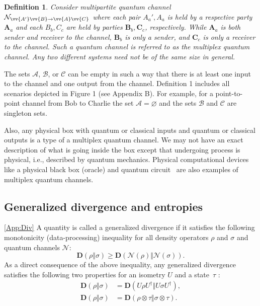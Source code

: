 \documentclass[aps,pra,twocolumn,superscriptaddress,longbibliography]{revtex4-1}
\let\emptyset\varnothing
\newcommand{\mc}[1]{\mathcal{#1}}
\newcommand{\tf}[1]{\textbf{#1}}
\newcommand{\msc}[1]{\mathscr{#1}}
\newtheorem{definition}{Definition}
\begin{document}
\begin{definition}
Consider multipartite quantum channel $\mc{N}_{\vv{A'}\vv{B}\to\vv{A}\vv{C}}$ where each pair $A_a', A_a$ is held by a respective party $\tf{A}_a$ and each $B_b,C_c$ are held by parties $\tf{B}_b,\tf{C}_c$, respectively. While $\tf{A}_a$ is both sender and receiver to the channel, $\tf{B}_b$ is only a sender, and $\tf{C}_c$ is only a receiver to the channel. Such a quantum channel is referred to as the multiplex quantum channel. Any two different systems need not be of the same size in general. 
\end{definition}

The sets $\msc{A}$, $\msc{B}$, or $\msc{C}$ can be empty in such a way that there is at least one input to the channel and one output from the channel. Definition 1 includes all scenarios depicted in Figure 1 (see Appendix B). For example, for a point-to-point channel from Bob to Charlie the set $\msc{A}=\emptyset$ and the sets $\msc{B}$ and $\msc{C}$ are singleton sets.

Also, any physical box with quantum or classical inputs and quantum or classical outputs is a type of a multiplex quantum channel. We may not have an exact description of what is going inside the box except that undergoing process is physical, i.e., described by quantum mechanics. Physical computational devices like a physical black box (oracle) and quantum circuit~\cite{NC00} are also examples of multiplex quantum channels.  

\subsection{Generalized divergence and entropies}\ref{App:Div}
A quantity is called a generalized divergence \cite{PV10,SW12} if it satisfies the following monotonicity (data-processing) inequality for all density operators $\rho$ and $\sigma$ and quantum channels $\mc{N}$:
\begin{equation}\label{eq:gen-div-mono}
\mathbf{D}(\rho\Vert \sigma)\geq \mathbf{D}(\mathcal{N}(\rho)\Vert \mc{N}(\sigma)).
\end{equation}
As a direct consequence of the above inequality, any generalized divergence satisfies the following two properties for an isometry $U$ and a state~$\tau$ \cite{WWY14}:
\begin{align}
\mathbf{D}(\rho\Vert \sigma) & = \mathbf{D}(U\rho U^\dag\Vert U \sigma U^\dag),\label{eq:gen-div-unitary}\\
\mathbf{D}(\rho\Vert \sigma) & = \mathbf{D}(\rho \otimes \tau \Vert \sigma \otimes \tau).\label{eq:gen-div-prod}
\end{align}
\end{document}
